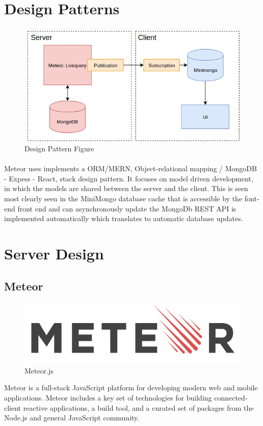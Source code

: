 \documentclass[12pt,a4paper]{report}
\begin{document}
	\section { Design Patterns }
		
		\begin{figure}[h]
			\includegraphics[scale=.7]{orm.png}
			\caption{Design Pattern Figure}
			\label{fig: Dasign Pattern }
		\end{figure}
		
		\paragraph{} Meteor uses implements a ORM/MERN, Object-relational mapping / MongoDB - Expess - React, stack design pattern. It focuses on model driven development, in which the models are shared between the server and the client. This is seen most clearly seen in the MiniMongo database cache that is accessible by the font-end front end and can asynchronously update the MongoDb REST API is implemented automatically which translates to automatic database updates.
		


\newpage
\section {Server Design}
	\subsection{Meteor}
		\begin{figure}
			\includegraphics[scale=.2]{meteorJS}
			\caption{Meteor.js}
			\label{fig: Meteor.js}
		\end{figure}
		Meteor is a full-stack JavaScript platform for developing modern web and mobile applications. Meteor includes a key set of technologies for building connected-client reactive applications, a build tool, and a curated set of packages from the Node.js and general JavaScript community.
		
\end{document}
